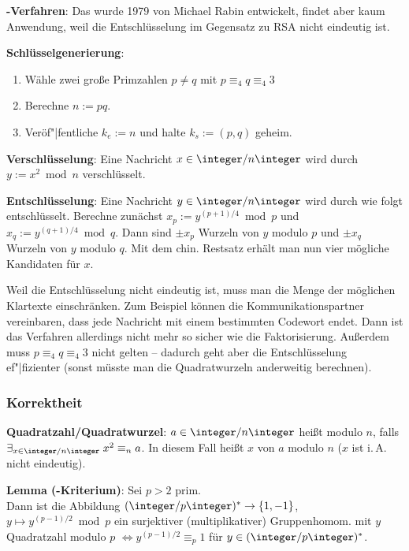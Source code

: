 \textbf{-Verfahren}:
Das  wurde 1979 von Michael Rabin entwickelt, findet aber
kaum Anwendung, weil die Entschlüsselung im Gegensatz zu RSA nicht eindeutig ist.

\textbf{Schlüsselgenerierung}:
\begin{enumerate}
    \item
    Wähle zwei große Primzahlen $p \not= q$ mit $p \equiv_4 q \equiv_4 3$
    
    \item
    Berechne $n := pq$.
    
    \item
    Veröf"|fentliche $k_e := n$ und halte $k_s := (p, q)$ geheim.
\end{enumerate}

\textbf{Verschlüsselung}:
Eine Nachricht $x \in \ZnZ$ wird durch $y := x^2 \bmod n$ verschlüsselt.

\textbf{Entschlüsselung}:
Eine Nachricht $y \in \ZnZ$ wird durch wie folgt entschlüsselt.
Berechne zunächst $x_p := y^{(p+1)/4} \bmod p$ und $x_q := y^{(q+1)/4} \bmod q$.
Dann sind $\pm x_p$ Wurzeln von $y$ modulo $p$ und
$\pm x_q$ Wurzeln von $y$ modulo $q$.
Mit dem chin. Restsatz erhält man nun vier mögliche Kandidaten für $x$.

Weil die Entschlüsselung nicht eindeutig ist, muss man die Menge der möglichen Klartexte
einschränken.
Zum Beispiel können die Kommunikationspartner vereinbaren, dass jede Nachricht mit einem
bestimmten Codewort endet.
Dann ist das Verfahren allerdings nicht mehr so sicher wie die Faktorisierung.
Außerdem muss $p \equiv_4 q \equiv_4 3$ nicht gelten --
dadurch geht aber die Entschlüsselung ef"|fizienter
(sonst müsste man die Quadratwurzeln anderweitig berechnen).

\subsubsection{%
    Korrektheit%
}

\textbf{Quadratzahl/Quadratwurzel}:
$a \in \ZnZ$ heißt  modulo $n$, falls
$\exists_{x \in \ZnZ}\; x^2 \equiv_n a$.
In diesem Fall heißt $x$  von $a$ modulo $n$
($x$ ist i.\,A. nicht eindeutig).

\textbf{Lemma (-Kriterium)}:
Sei $p > 2$ prim.\\
Dann ist die Abbildung $(\ZpZ)^\ast \rightarrow \{1, -1\}$,
$y \mapsto y^{(p-1)/2} \bmod p$ ein surjektiver (multiplikativer) Gruppenhomom. mit
$y$ Quadratzahl modulo $p$ $\iff y^{(p-1)/2} \equiv_p 1$
für $y \in (\ZpZ)^\ast$.

